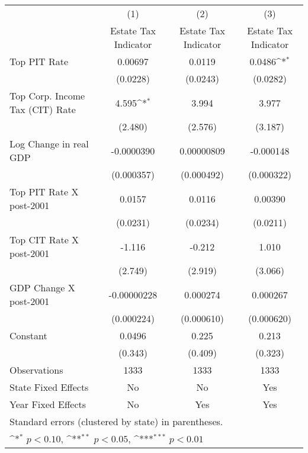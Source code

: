 {
\def\sym#1{\ifmmode^{#1}\else\(^{#1}\)\fi}
\begin{tabular}{l*{3}{c}}
\hline\hline
                &\multicolumn{1}{c}{(1)}&\multicolumn{1}{c}{(2)}&\multicolumn{1}{c}{(3)}\\
                &\multicolumn{1}{c}{Estate Tax Indicator}&\multicolumn{1}{c}{Estate Tax Indicator}&\multicolumn{1}{c}{Estate Tax Indicator}\\
\hline
Top PIT Rate    &  0.00697         &   0.0119         &   0.0486\sym{*}  \\
                & (0.0228)         & (0.0243)         & (0.0282)         \\
[1em]
Top Corp. Income Tax (CIT) Rate&    4.595\sym{*}  &    3.994         &    3.977         \\
                &  (2.480)         &  (2.576)         &  (3.187)         \\
[1em]
Log Change in real GDP&-0.0000390         &0.00000809         &-0.000148         \\
                &(0.000357)         &(0.000492)         &(0.000322)         \\
[1em]
Top PIT Rate X post-2001&   0.0157         &   0.0116         &  0.00390         \\
                & (0.0231)         & (0.0234)         & (0.0211)         \\
[1em]
Top CIT Rate X post-2001&   -1.116         &   -0.212         &    1.010         \\
                &  (2.749)         &  (2.919)         &  (3.066)         \\
[1em]
GDP Change X post-2001&-0.00000228         & 0.000274         & 0.000267         \\
                &(0.000224)         &(0.000610)         &(0.000620)         \\
[1em]
Constant        &   0.0496         &    0.225         &    0.213         \\
                &  (0.343)         &  (0.409)         &  (0.323)         \\
\hline
Observations    &     1333         &     1333         &     1333         \\
State Fixed Effects         &       No         &       No         &      Yes         \\
Year Fixed Effects          &       No         &      Yes         &      Yes         \\
\hline \hline
\multicolumn{3}{l}{\footnotesize Standard errors (clustered by state) in parentheses.}\\
\multicolumn{3}{l}{\footnotesize \sym{*} \(p<0.10\), \sym{**} \(p<0.05\), \sym{***} \(p<0.01\)}  \end{tabular} }
